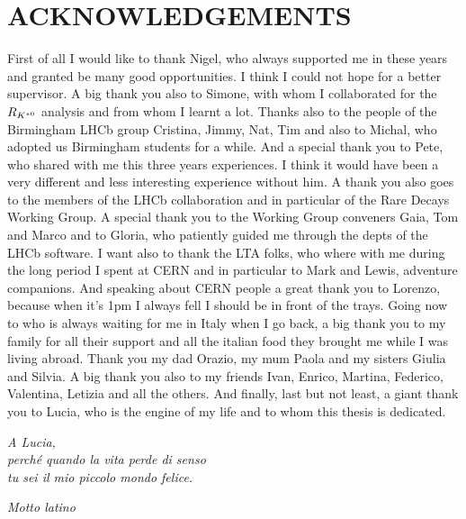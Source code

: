 \chapter*{ACKNOWLEDGEMENTS}
%
First of all I would like to thank Nigel, who always supported me in these years and
granted be many good opportunities. I think I could not hope for a better supervisor.
A big thank you also to Simone, with whom I collaborated for the $R_{K^{*0}}$ analysis
and from whom I learnt a lot. Thanks also to the people of the Birmingham LHCb group
Cristina, Jimmy, Nat, Tim and also to Michal, who adopted us Birmingham students for a while.
And a special thank you to Pete, who shared with me this three years experiences.
I think it would have been a very different and less interesting experience without him.
A thank you also goes to the members of the LHCb collaboration and in particular of the Rare
Decays Working Group. A special thank you to the Working Group conveners Gaia, Tom and Marco
and to Gloria, who patiently guided me through the depts of the LHCb software.
I want also to thank the LTA folks, who where with me during the long period I spent at CERN
and in particular to Mark and Lewis, adventure companions. And speaking about CERN people
a great thank you to Lorenzo, because when it's 1pm I always fell I should be in front of the trays.
Going now to who is always waiting for me in Italy when I go back, a big thank you to my
family for all their support and all the italian food they brought me while I was living abroad.
Thank you my dad Orazio, my mum Paola and my sisters Giulia and
Silvia. A big thank you also to my friends Ivan, Enrico, Martina, Federico, Valentina, Letizia
and all the others. And finally, last but not least, a giant thank you to Lucia, who is the engine
of my life and to whom this thesis is dedicated.
%
\cleardoublepage
~

\begin{flushright}
  \emph{A Lucia, \\
  perch\'{e} quando la vita perde di senso \\
  tu sei il mio piccolo mondo felice.}
  
  \vspace{10cm}
  
   \emph{Motto latino} 
\end{flushright}

\cleardoublepage
